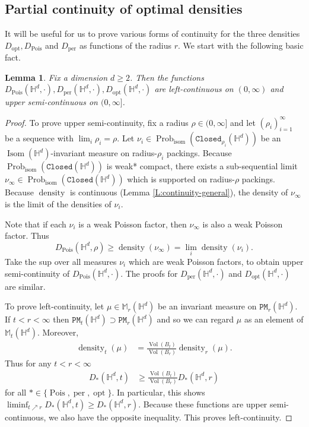 \documentclass[11pt]{amsart}
\newtheorem{lemma}[theorem]{Lemma}
\theoremstyle{definition}
\theoremstyle{remark}
\renewcommand{\H}{\mathbb{H}}
\newcommand{\M}{\mathbb{M}}
\newcommand{\cP}{\mathtt{PM}}
\newcommand{\Closed}{\mathtt{Closed}}
\newcommand{\isom}{\operatorname{isom}}
\newcommand{\Isom}{\operatorname{Isom}}
\newcommand{\density}{\operatorname{density}}
\newcommand{\opt}{\operatorname{opt}}
\newcommand{\per}{\operatorname{per}}
\newcommand{\Pois}{\operatorname{Pois}}
\newcommand{\Prob}{\operatorname{Prob}}
\newcommand{\Dopt}{D_{\opt}}
\newcommand{\vol}{\operatorname{Vol}}
\begin{document}
\subsection{Partial continuity of optimal densities}

It will be useful for us to prove various forms of continuity for the three densities $\Dopt,D_{\Pois}$ and $D_{\per}$ {as functions of the radius $r$}.  We start with the following basic fact.
\begin{lemma}\label{L:PoissonGap2}
 Fix a dimension $d\ge 2$. Then the functions $D_{\Pois}(\H^d,\cdot), D_{\per}(\H^d,\cdot), D_{\opt}(\H^d,\cdot)$ are left-continuous on $(0,\infty)$ and upper semi-continuous on $(0,\infty]$. 
\end{lemma}

\begin{proof}

 To prove upper semi-continuity, fix a radius $\rho \in (0,\infty]$ and let $(\rho_i)_{i=1}^\infty$ be a sequence with $\lim_i \rho_i = \rho$. Let $\nu_i \in \Prob_{\isom}(\Closed_{\rho_i}(\H^d))$ be an $\Isom(\H^d)$-invariant measure on radius-$\rho_i$ packings. Because $\Prob_{\isom}(\Closed(\H^d))$ is weak* compact, there exists a sub-sequential limit $\nu_\infty\in \Prob_{\isom}(\Closed(\H^d))$ which is supported on radius-$\rho$ packings.  Because $\density$ is continuous (Lemma \ref{L:continuity-general}), the density of $\nu_\infty$ is the limit of the densities of $\nu_i$.

    Note that if each $\nu_i$ is a weak Poisson factor, then $\nu_\infty$ is also a weak Poisson factor.  Thus
    $$D_{\Pois}(\H^d,\rho) \ge \density(\nu_\infty) = \lim_i \density(\nu_i).$$
Take the sup over all measures $\nu_i$ which are weak Poisson factors, to obtain upper semi-continuity of $D_{\Pois}(\H^d,\cdot)$. The proofs for $D_{\per}(\H^d,\cdot)$ and $D_{\opt}(\H^d,\cdot)$ are similar.
  

To prove left-continuity, let $\mu \in \M_r(\H^d)$ be an invariant measure on $\cP_r(\H^d)$. If $t<r<\infty$ then $\cP_t(\H^d) \supset \cP_r(\H^d)$ and so we can regard $\mu$ as an element of $\M_t(\H^d)$. Moreover,  
\begin{align*}
    \density_t(\mu) &= \frac{\vol(B_t)}{\vol(B_r)}\density_r(\mu).
\end{align*}
Thus for any $t<r<\infty$
\begin{align}\label{E:continuity1}
    D_*(\H^d,t) &\ge \frac{\vol(B_t)}{\vol(B_r)}D_*(\H^d,r)
\end{align}
for all $* \in \{\Pois, \per,\opt\}$. In particular, this shows $\liminf_{t\nearrow r} D_{*}(\H^d,t) \ge D_{*}(\H^d,r)$. Because these functions are upper semi-continuous, we also have the opposite inequality. This proves left-continuity. 
\end{proof}
\end{document}
